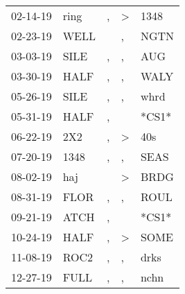 \begin{supertabular}{p{0.07\textwidth}p{0.06\textwidth}p{0.02\textwidth}p{0.02\textwidth}p{0.06\textwidth}}
          02-14-19\textsuperscript{} &           ring\textsuperscript{} &                , &     \textgreater &           1348\textsuperscript{} \\
          02-23-19\textsuperscript{} &           WELL\textsuperscript{} &                  &                , &           NGTN\textsuperscript{} \\
          03-03-19\textsuperscript{} &           SILE\textsuperscript{} &                , &                , &            AUG\textsuperscript{} \\
          03-30-19\textsuperscript{} &           HALF\textsuperscript{} &                , &                , &           WALY\textsuperscript{} \\
          05-26-19\textsuperscript{} &           SILE\textsuperscript{} &                , &                , &           whrd\textsuperscript{} \\
          05-31-19\textsuperscript{} &           HALF\textsuperscript{} &                , &                  &                            *CS1* \\
          06-22-19\textsuperscript{} &            2X2\textsuperscript{} &                , &     \textgreater &            40s\textsuperscript{} \\
          07-20-19\textsuperscript{} &           1348\textsuperscript{} &                , &                , &           SEAS\textsuperscript{} \\
          08-02-19\textsuperscript{} &            haj\textsuperscript{} &                  &     \textgreater &           BRDG\textsuperscript{} \\
          08-31-19\textsuperscript{} &           FLOR\textsuperscript{} &                , &                , &           ROUL\textsuperscript{} \\
          09-21-19\textsuperscript{} &           ATCH\textsuperscript{} &                , &                  &                            *CS1* \\
          10-24-19\textsuperscript{} &           HALF\textsuperscript{} &                , &     \textgreater &           SOME\textsuperscript{} \\
          11-08-19\textsuperscript{} &           ROC2\textsuperscript{} &                , &                , &           drks\textsuperscript{} \\
          12-27-19\textsuperscript{} &           FULL\textsuperscript{} &                , &                , &           nchn\textsuperscript{} \\

\end{supertabular}
